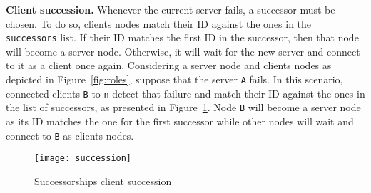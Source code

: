 \noindent\textbf{Client succession.} 
Whenever the current server fails, a successor must be chosen. 
To do so, clients nodes match their ID against the ones in the \texttt{successors} list.
If their ID matches the first ID in the successor, then that node will become a server node.
Otherwise, it will wait for the new server and connect to it as a client once again.
Considering a server node and clients nodes as depicted in Figure~\ref{fig:roles}, suppose that the server \texttt{A} fails. In this scenario, connected clients \texttt{B} to \texttt{n} detect that failure and match their ID against the ones in the list of successors, as presented in Figure~\ref{fig:succession}. Node \texttt{B} will become a server node as its ID matches the one for the first successor while other nodes will wait and connect to \texttt{B} as clients nodes.

\begin{figure}[h]
    \centering
    \texttt{[image: succession]}
    \caption{Successorships client succession}
    \label{fig:succession}
\end{figure}

